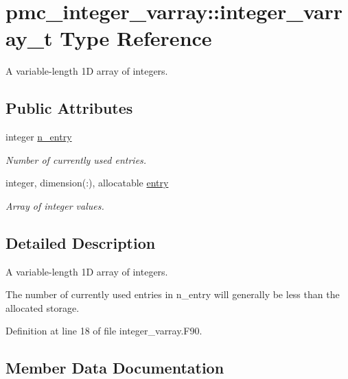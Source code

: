 \hypertarget{structpmc__integer__varray_1_1integer__varray__t}{}\section{pmc\+\_\+integer\+\_\+varray\+:\+:integer\+\_\+varray\+\_\+t Type Reference}
\label{structpmc__integer__varray_1_1integer__varray__t}


A variable-\/length 1D array of integers.  


\subsection*{Public Attributes}
\begin{DoxyCompactItemize}
\item 
integer \mbox{\hyperlink{structpmc__integer__varray_1_1integer__varray__t_a244e71cc84b0d31643b20b00d7687277}{n\+\_\+entry}}
\begin{DoxyCompactList}\small\item\em Number of currently used entries. \end{DoxyCompactList}\item 
integer, dimension(\+:), allocatable \mbox{\hyperlink{structpmc__integer__varray_1_1integer__varray__t_a7481c38e0e4bf509bd1608f1a7f3ed43}{entry}}
\begin{DoxyCompactList}\small\item\em Array of integer values. \end{DoxyCompactList}\end{DoxyCompactItemize}


\subsection{Detailed Description}
A variable-\/length 1D array of integers. 

The number of currently used entries in {\ttfamily n\+\_\+entry} will generally be less than the allocated storage. 

Definition at line 18 of file integer\+\_\+varray.\+F90.



\subsection{Member Data Documentation}
\mbox{\label{structpmc__integer__varray_1_1integer__varray__t_a7481c38e0e4bf509bd1608f1a7f3ed43}} 
